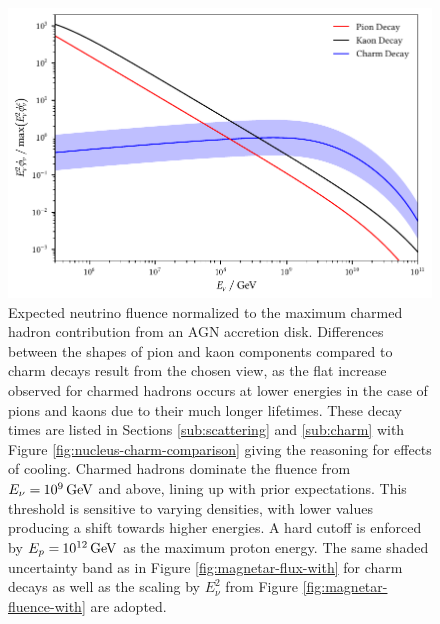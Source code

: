 \begin{figure}[H]
	\centering
	\includegraphics{../plots/build/nucleus_neutrino_spectrum.pdf}
	\caption[AGN accretion disk $\nu \kern+0.5pt$ fluence compared to $c$ decay.]
			{Expected neutrino fluence normalized to the maximum charmed hadron contribution from an AGN accretion disk.
			 Differences between the shapes of pion and kaon components compared to charm decays result from the chosen
			 view, as the flat increase observed for charmed hadrons occurs at lower energies in the case of pions and kaons
			 due to their much longer lifetimes. These decay times are listed in Sections \ref{sub:scattering} and \ref{sub:charm}
			 with Figure \ref{fig:nucleus-charm-comparison} giving the reasoning for effects of cooling. Charmed hadrons dominate
			 the fluence from $E_\nu = \kern-0.5pt \qty{e9}{\giga\electronvolt}$ and above, lining up with prior expectations. This
			 threshold is sensitive to varying densities, with lower values producing a shift towards higher energies. A hard cutoff
			 is enforced by $E_p = \kern-0.5pt \qty{e12}{\giga\electronvolt}$ as the maximum proton energy. The same shaded uncertainty
			 band as in Figure \ref{fig:magnetar-flux-with} for charm decays as well as the scaling by $E_\nu^2$ from
			 Figure \ref{fig:magnetar-fluence-with} are adopted.}
	\label{fig:nucleus-fluence}
\end{figure}
